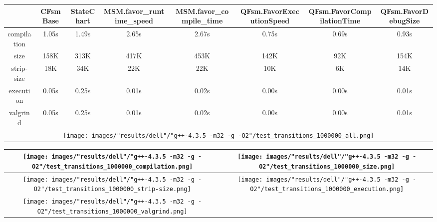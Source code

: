 \begin{landscape}
\begin{table}
\caption{"dell" [df6407d], g++-4.3.5 -m32 -g -O2/test transitions 1000000}
\centering
\begin{longtable}{| c | c |c |c |c |c |c |c |}
\hline
& CFsmBase& StateChart& MSM.favor\_runtime\_speed& MSM.favor\_compile\_time& QFsm.FavorExecutionSpeed& QFsm.FavorCompilationTime& QFsm.FavorDebugSize\\
\hline
compilation & 1.05s & 1.49s & 2.65s & 2.67s & 0.75s & 0.69s & 0.93s\\
\hline
size & 158K & 313K & 417K & 453K & 142K & 92K & 154K\\
\hline
strip-size & 18K & 34K & 22K & 22K & 10K & 6K & 14K\\
\hline
execution & 0.05s & 0.25s & 0.01s & 0.02s & 0.00s & 0.00s & 0.01s\\
\hline
valgrind & 0.05s & 0.25s & 0.01s & 0.02s & 0.00s & 0.00s & 0.01s\\
\hline
\multicolumn{8}{|c|}{\texttt{[image: images/"results/dell"/"g++-4.3.5 -m32 -g -O2"/test\_transitions\_1000000\_all.png]}}\\
\hline
\end{longtable}
\end{table}
\end{landscape}
\newpage
\begin{table}
\centering
\begin{longtable}{| c | c |}
\hline
\texttt{[image: images/"results/dell"/"g++-4.3.5 -m32 -g -O2"/test\_transitions\_1000000\_compilation.png]}& \texttt{[image: images/"results/dell"/"g++-4.3.5 -m32 -g -O2"/test\_transitions\_1000000\_size.png]}\\
\hline
\texttt{[image: images/"results/dell"/"g++-4.3.5 -m32 -g -O2"/test\_transitions\_1000000\_strip-size.png]}& \texttt{[image: images/"results/dell"/"g++-4.3.5 -m32 -g -O2"/test\_transitions\_1000000\_execution.png]}\\
\hline
\texttt{[image: images/"results/dell"/"g++-4.3.5 -m32 -g -O2"/test\_transitions\_1000000\_valgrind.png]}& \\ \hline
\end{longtable}
\end{table}

